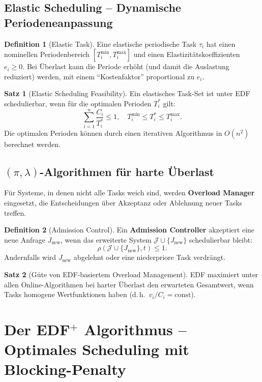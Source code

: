 ﻿\documentclass[a4paper,12pt]{report}
\theoremstyle{definition}
\newtheorem{definition}{Definition}[chapter]
\newtheorem{satz}{Satz}[chapter]
\begin{document}
\section{Elastic Scheduling -- Dynamische Periodeneanpassung}

\begin{definition}[Elastic Task]
	Eine elastische periodische Task $\tau_i$ hat einen nominellen Periodenbereich
	$[T_i^{\min}, T_i^{\max}]$ und einen Elastizitätskoeffizienten $e_i \geq 0$.
	Bei Überlast kann die Periode erhöht (und damit die Auslastung reduziert) werden,
	mit einem ``Kostenfaktor'' proportional zu $e_i$.
\end{definition}

\begin{satz}[Elastic Scheduling Feasibility]
	Ein elastisches Task-Set ist unter EDF schedulierbar, wenn für die optimalen
	Perioden $T_i^*$ gilt:
	\[
		\sum_{i=1}^n \frac{C_i}{T_i^*} \leq 1, \quad T_i^{\min} \leq T_i^* \leq T_i^{\max}.
	\]
	Die optimalen Perioden können durch einen iterativen Algorithmus in $O(n^2)$
	berechnet werden.
\end{satz}

\section{$(\pi, \lambda)$-Algorithmen für harte Überlast}

Für Systeme, in denen nicht alle Tasks weich sind, werden \textbf{Overload Manager}
eingesetzt, die Entscheidungen über Akzeptanz oder Ablehnung neuer Tasks treffen.

\begin{definition}[Admission Control]
	Ein \textbf{Admission Controller} akzeptiert eine neue Anfrage $J_{\text{new}}$,
	wenn das erweiterte System $\mathcal{J} \cup \{J_{\text{new}}\}$ schedulierbar
	bleibt:
	\[
		\rho(\mathcal{J} \cup \{J_{\text{new}}\}, t) \leq 1.
	\]
	Andernfalls wird $J_{\text{new}}$ abgelehnt oder eine niederpriore Task
	verdrängt.
\end{definition}

\begin{satz}[Güte von EDF-basiertem Overload Management]
	EDF maximiert unter allen Online-Algorithmen bei harter Überlast den
	erwarteten Gesamtwert, wenn Tasks homogene Wertfunktionen haben (d.\,h.\
	$v_i/C_i = \mathrm{const}$).
\end{satz}

\chapter{Der EDF\texorpdfstring{$^+$}{+} Algorithmus -- Optimales Scheduling mit Blocking-Penalty}
\label{chap:edfplus}
\end{document}
